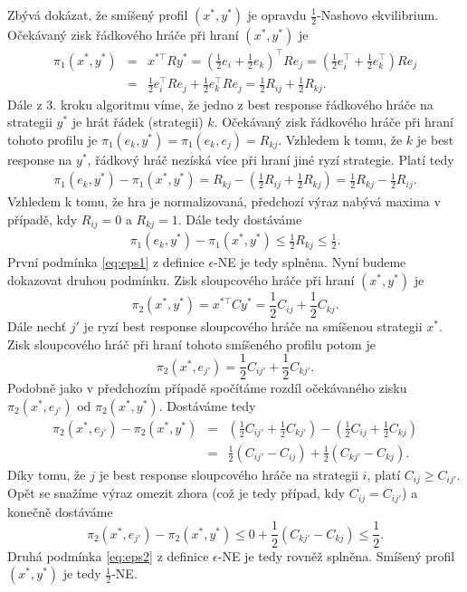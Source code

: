 \documentclass[a4paper,12pt]{article}
\begin{document}
Zbývá dokázat, že smíšený profil $(x^*, y^*)$ je opravdu $\frac{1}{2}$-Nashovo ekvilibrium. Očekávaný zisk řádkového hráče 
při hraní $(x^*, y^*)$ je
\begin{eqnarray}
  \pi_1(x^*, y^*) &=& x^{*\top}Ry^* = \left(\frac{1}{2}e_i + \frac{1}{2}e_k\right)^\top Re_j = \left(\frac{1}{2}e_i^\top + \frac{1}{2}e_k^\top\right) Re_j \\ &=& 
  \frac{1}{2}e_i^\top Re_j + \frac{1}{2}e_k^\top Re_j = \frac{1}{2}R_{ij} + \frac{1}{2}R_{kj}.
\end{eqnarray}
Dále z 3. kroku algoritmu víme, že jedno z best response řádkového hráče na strategii $y^*$ je hrát řádek (strategii) $k$. Očekávaný zisk
řádkového hráče při hraní tohoto profilu je $\pi_1(e_k, y^*) = \pi_1(e_k, e_j) = R_{kj}$. Vzhledem k tomu, že $k$ je best response
na $y^*$, řádkový hráč nezíská více při hraní jiné ryzí strategie. Platí tedy
\begin{eqnarray}
  \pi_1(e_k, y^*) - \pi_1(x^*, y^*) = R_{kj} - \left(\frac{1}{2}R_{ij} + \frac{1}{2}R_{kj}\right) = \frac{1}{2}R_{kj} - \frac{1}{2}R_{ij}.
\end{eqnarray}
Vzhledem k tomu, že hra je normalizovaná, předchozí výraz nabývá maxima v případě, kdy $R_{ij} = 0$ a $R_{kj} = 1$. Dále tedy dostáváme
\begin{eqnarray}
  \pi_1(e_k, y^*) - \pi_1(x^*, y^*) \leq \frac{1}{2}R_{kj} \leq \frac{1}{2}.
\end{eqnarray}
První podmínka \eqref{eq:eps1} z definice $\epsilon$-NE je tedy splněna. Nyní budeme dokazovat druhou podmínku.
Zisk sloupcového hráče při hraní $(x^*, y^*)$ je
\begin{equation}
  \pi_2(x^*, y^*) = x^{*\top}Cy^* = \frac{1}{2}C_{ij} + \frac{1}{2}C_{kj}.
\end{equation}
Dále nechť $j'$ je ryzí best response sloupcového hráče na smíšenou strategii $x^*$. Zisk sloupcového hráč při hraní tohoto
smíšeného profilu potom je 
\begin{equation}
  \pi_2(x^*, e_{j'}) = \frac{1}{2}C_{ij'} + \frac{1}{2}C_{kj'}.
\end{equation}
Podobně jako v předchozím případě spočítáme rozdíl očekávaného zisku $\pi_2(x^*, e_{j'})$ od $\pi_2(x^*, y^*)$. Dostáváme tedy
\begin{eqnarray}
  \pi_2(x^*, e_{j'}) - \pi_2(x^*, y^*) &=& \left(\frac{1}{2}C_{ij'} + \frac{1}{2}C_{kj'}\right) - \left(\frac{1}{2}C_{ij} + \frac{1}{2}C_{kj}\right) \\
  &=&\frac{1}{2}\left(C_{ij'} - C_{ij}\right) + \frac{1}{2}\left(C_{kj'}-C_{kj}\right).
\end{eqnarray}
Díky tomu, že $j$ je best response sloupcového hráče na strategii $i$, platí $C_{ij} \geq C_{ij'}$. Opět se snažíme výraz omezit
zhora (což je tedy případ, kdy $C_{ij} = C_{ij'}$) a konečně dostáváme
\begin{equation}
  \pi_2(x^*, e_{j'}) - \pi_2(x^*, y^*) \leq 0 +  \frac{1}{2}(C_{kj'}-C_{kj}) \leq \frac{1}{2}.
\end{equation}
Druhá podmínka \eqref{eq:eps2} z definice $\epsilon$-NE je tedy rovněž splněna. Smíšený profil $(x^*, y^*)$ je tedy $\frac{1}{2}$-NE.
\end{document}
